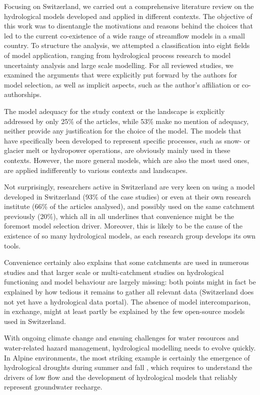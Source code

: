 \documentclass[10pt,a4paper]{article}
\begin{document}
Focusing on Switzerland, we carried out a comprehensive literature review on the hydrological models developed and applied in different contexts. The objective of this work was to disentangle the motivations and reasons behind the choices that led to the current co-existence of a wide range of streamflow models in a small country. To structure the analysis, we attempted a classification into eight fields of model application, ranging from hydrological process research to model uncertainty analysis and large scale modelling. For all reviewed studies, we examined the arguments that were explicitly put forward by the authors for model selection, as well as implicit aspects, such as the author's affiliation or co-authorships. 

The model adequacy for the study context or the landscape is explicitly addressed by only 25\% of the articles, while 53\% make no mention of adequacy, neither provide any justification for the choice of the model. The models that have specifically been developed to represent specific processes, such as snow- or glacier melt or hydropower operations, are obviously mainly used in these contexts. However, the more general models, which are also the most used ones, are applied indifferently to various contexts and landscapes.

Not surprisingly, researchers active in Switzerland are very keen on using a model developed in Switzerland (93\% of the case studies) or even at their own research institute (66\% of the articles analysed), and possibly used on the same catchment previously (20\%), which all in all underlines that convenience might be the foremost model selection driver. Moreover, this is likely to be the cause of the existence of so many hydrological models, as each research group develops its own tools.

Convenience certainly also explains that some catchments are used in numerous studies and that larger scale or multi-catchment studies on hydrological functioning and model behaviour are largely missing: both points might in fact be explained by how tedious it remains to gather all relevant data (Switzerland does not yet have a hydrological data portal). The absence of model intercomparison, in exchange, might at least partly be explained by the few open-source models used in
Switzerland. 

With ongoing climate change and ensuing challenges for water resources and water-related hazard management, hydrological modelling needs to evolve quickly. In Alpine environments, the most striking example is certainly the emergence of hydrological droughts \citep{Van_Loon_2015} during summer and fall \citep{Brunner2019e, Rigling2020}, which requires to understand the drivers of low flow \citep{Arnoux_2020} and the development of hydrological models that reliably represent groundwater recharge.
\end{document}
